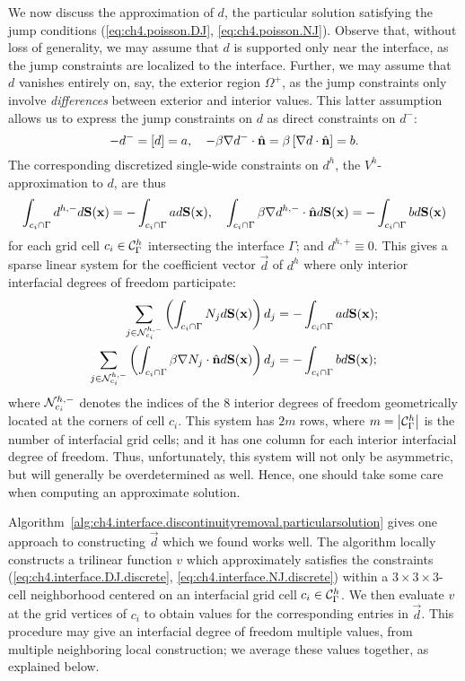 We now discuss the approximation of $d$, the particular solution satisfying the jump conditions (\ref{eq:ch4.poisson.DJ}, \ref{eq:ch4.poisson.NJ}). Observe that, without loss of generality, we may assume that $d$ is supported only near the interface, as the jump constraints are localized to the interface. Further, we may assume that $d$ vanishes entirely on, say, the exterior region $\Omega^+$, as the jump constraints only involve \emph{differences} between exterior and interior values. This latter assumption allows us to express the jump constraints on $d$ as direct constraints on $d^-$:
\begin{equation*}
-d^- = \left[ d \right] = a, \quad -\beta \nabla d^- \cdot \hat{\mathbf{n}} = \beta \left[ \nabla d \cdot \hat{\mathbf{n}} \right] = b.
\end{equation*}
The corresponding discretized single-wide constraints on $d^h$, the $V^h$-approximation to $d$, are thus
\begin{equation*}
\int_{c_i \cap \Gamma} d^{h,-} d\mathbf{S}(\mathbf{x}) = -\int_{c_i \cap \Gamma} a d\mathbf{S}(\mathbf{x}), \quad
\int_{c_i \cap \Gamma} \beta \nabla d^{h,-} \cdot \hat{\mathbf{n}} d\mathbf{S}(\mathbf{x}) = -\int_{c_i \cap \Gamma} b d\mathbf{S}(\mathbf{x})
\end{equation*}
for each grid cell $c_i \in \mathcal{C}_{\Gamma}^h$ intersecting the interface $\Gamma$; and $d^{h,+} \equiv 0$. This gives a sparse linear system for the coefficient vector $\vec{d}$ of $d^h$ where only interior interfacial degrees of freedom participate:
\begin{align}
\sum_{j \in \mathcal{N}^{h,-}_{c_i}} \left( \int_{c_i \cap \Gamma} N_j d\mathbf{S}(\mathbf{x}) \right) d_j & = -\int_{c_i \cap \Gamma} a d\mathbf{S}(\mathbf{x}); \label{eq:ch4.interface.DJ.discrete} \\
\sum_{j \in \mathcal{N}^{h,-}_{c_i}} \left( \int_{c_i \cap \Gamma} \beta \nabla N_j \cdot \hat{\mathbf{n}} d\mathbf{S}(\mathbf{x}) \right) d_j & = -\int_{c_i \cap \Gamma} b d\mathbf{S}(\mathbf{x}); \label{eq:ch4.interface.NJ.discrete}
\end{align}
where $\mathcal{N}^{h,-}_{c_i}$ denotes the indices of the $8$ interior degrees of freedom geometrically located at the corners of cell $c_i$. This system has $2m$ rows, where $m = \left\lvert \mathcal{C}_{\Gamma}^h \right\rvert$ is the number of interfacial grid cells; and it has one column for each interior interfacial degree of freedom. Thus, unfortunately, this system will not only be asymmetric, but will generally be overdetermined as well. Hence, one should take some care when computing an approximate solution.

Algorithm~\ref{alg:ch4.interface.discontinuityremoval.particularsolution} gives one approach to constructing $\vec{d}$ which we found works well. The algorithm locally constructs a trilinear function $v$ which approximately satisfies the constraints (\ref{eq:ch4.interface.DJ.discrete}, \ref{eq:ch4.interface.NJ.discrete}) within a $3 \times 3 \times 3$-cell neighborhood centered on an interfacial grid cell $c_i \in \mathcal{C}_{\Gamma}^h$. We then evaluate $v$ at the grid vertices of $c_i$ to obtain values for the corresponding entries in $\vec{d}$. This procedure may give an interfacial degree of freedom multiple values, from multiple neighboring local construction; we average these values together, as explained below.

